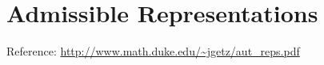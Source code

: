 \chapter{Admissible Representations}
\label{cha:admissible_representations}

Reference:
\url{http://www.math.duke.edu/~jgetz/aut_reps.pdf}




\appendix

